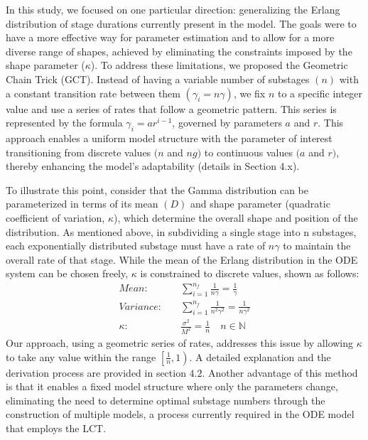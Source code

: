 \documentclass[12pt]{article}
\begin{document}
In this study, we focused on one particular direction: generalizing the Erlang distribution of stage durations currently present in the model. The goals were to have a more effective way for parameter estimation and to allow for a more diverse range of shapes, achieved by eliminating the constraints imposed by the shape parameter ($\kappa$). To address these limitations, we proposed the Geometric Chain Trick (GCT). Instead of having a variable number of substages $(n)$ with a constant transition rate between them $(\gamma_i = n\gamma)$, we fix $n$ to a specific integer value and use a series of rates that follow a geometric pattern. This series is represented by the formula $\gamma_i = ar^{i-1}$, governed by parameters $a$ and $r$. This approach enables a uniform model structure with the parameter of interest transitioning from discrete values $(n$ and $ng)$ to continuous values $(a$ and $r)$, thereby enhancing the model's adaptability (details in Section 4.x).

To illustrate this point, consider that the Gamma distribution can be parameterized in terms of its mean $(D)$ and shape parameter (quadratic coefficient of variation, $\kappa$), which determine the overall shape and position of the distribution. As mentioned above, in subdividing a single stage into n substages, each exponentially distributed substage must have a rate of $n\gamma$ to maintain the overall rate of that stage. While the mean of the Erlang distribution in the ODE system can be chosen freely, $\kappa$ is constrained to discrete values, shown as follows:
\begin{align*}
    Mean: \quad &\sum_{i=1}^{n_f} \frac{1}{n\gamma} = \frac{1}{\gamma}\\
    Variance: \quad &\sum_{i=1}^{n_f} \frac{1}{n^2\gamma^2} = \frac{1}{n\gamma^2} \\
    \kappa: \quad &\frac{\sigma^2}{M^2} = \frac{1}{n} \quad n \in \mathbb{N}
\end{align*}
Our approach, using a geometric series of rates, addresses this issue by allowing $\kappa$ to take any value within the range $\left[ \frac{1}{n}, 1 \right)$. A detailed explanation and the derivation process are provided in section $4.2$. Another advantage of this method is that it enables a fixed model structure where only the parameters change, eliminating the need to determine optimal substage numbers through the construction of multiple models, a process currently required in the ODE model that employs the LCT.
\end{document}
